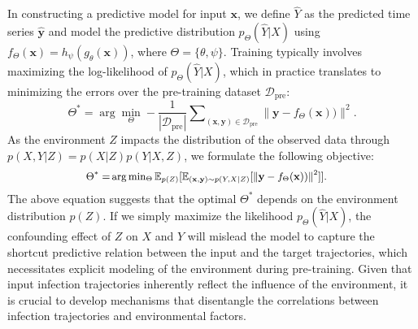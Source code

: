 In constructing a predictive model for input $\mathbf{x}$, we define \(\hat{Y}\) as the predicted time series \(\hat{\mathbf{y}}\) and model the predictive distribution \( p_\Theta(\hat{Y} | X) \) using \( f_\Theta(\mathbf{x}) = h_\psi(g_\theta(\mathbf{x})) \), where \( \Theta = \{\theta, \psi\} \). Training typically involves maximizing the log-likelihood of \( p_\Theta(\hat{Y} | X) \), which in practice translates to minimizing the errors over the pre-training dataset \( \mathcal{D}_\text{pre} \):
\vskip -7mm
\begin{equation}
\Theta^* = \arg\min_{\Theta} - \frac{1}{|\mathcal{D}_\text{pre}|} \sum\nolimits_{(\mathbf{x}, \mathbf{y}) \in \mathcal{D}_\text{pre}} \|\mathbf{y} - f_\Theta(\mathbf{x}))\|^2.
\end{equation}
\vskip -4mm
As the environment $Z$ impacts the distribution of the observed data through $p(X, Y | Z) = p(X | Z)p(Y | X, Z)$, we formulate the following objective:
\begin{equation}
\label{Eq: optim}
\small
\begin{split}
\Theta^* = & \arg\min\nolimits_{\Theta}  \mathbb{E}_{p(Z)} [ \mathbb{E}_{(\mathbf{x}, \mathbf{y}) \sim p(Y, X | Z)} [ \|\mathbf{y} - f_\Theta(\mathbf{x}))\|^2 ]  ].
\end{split}
\end{equation}
The above equation suggests that the optimal $\Theta^*$ depends on the environment distribution $p(Z)$. If we simply maximize the likelihood $p_\Theta(\hat{Y} |X)$, the confounding effect of $Z$ on $X$ and $Y$ will mislead the model to capture the shortcut predictive relation between the input and the target trajectories, which necessitates explicit modeling of the environment during pre-training. Given that input infection trajectories inherently reflect the influence of the environment, it is crucial to develop mechanisms that disentangle the correlations between infection trajectories and environmental factors.

